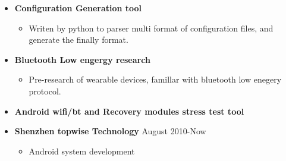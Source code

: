 \documentclass[a4paper, 10pt, titlepage]{article}
\begin{document}
\begin{itemize}
\item \textbf{Configuration Generation tool}
  \begin{itemize}
    \item Writen by python to parser multi format of configuration files, and generate the finally format.
  \end{itemize}

\item \textbf{Bluetooth Low engergy research}
  \begin{itemize}
    \item Pre-research of wearable devices, famillar with bluetooth low enegery protocol.
  \end{itemize}

\item \textbf{Android wifi/bt and Recovery modules stress test tool}

\end{itemize}



\begin{itemize}

\item \textbf{Shenzhen topwise Technology} \hfill \textrm{August 2010-Now}
  \begin{itemize}
    \item Android system development
  \end{itemize}

\end{itemize}

\end{document}
